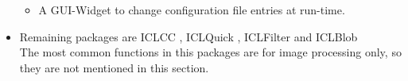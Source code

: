 \begin{itemize}
\begin{itemize}
        \item A GUI-Widget to change configuration file entries at run-time.\\
\end{itemize}

\item Remaining packages are ICLCC , ICLQuick , ICLFilter  and ICLBlob \\
The most common functions in this packages are for image processing only, so they are not mentioned in this section.


\end{itemize}

